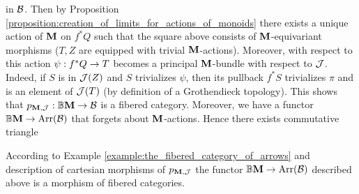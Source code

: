 in ${\mathcal B}$. Then by Proposition \ref{proposition:creation_of_limits_for_actions_of_monoids} there exists a unique action of $\mathbf{M}$ on $f^*Q$ such that the square above consists of $\mathbf{M}$-equivariant morphisms ($T,Z$ are equipped with trivial $\mathbf{M}$-actions). Moreover, with respect to this action $\psi:f^*Q\rightarrow T$ becomes a principal $\mathbf{M}$-bundle with respect to ${\mathcal J}$. Indeed, if $S$ is in ${\mathcal J}(Z)$ and $S$ trivializes $\psi$, then its pullback $f^*S$ trivializes $\pi$ and is an element of ${\mathcal J}(T)$ (by definition of a Grothendieck topology). This shows that $p_{\mathbf{M},{\mathcal J}}:\mathbb{B}\mathbf{M}\rightarrow {\mathcal B}$ is a fibered category. Moreover, we have a functor $\mathbb{B}\mathbf{M}\rightarrow \mathrm{Arr}({\mathcal B})$ that forgets about $\mathbf{M}$-actions. Hence there exists commutative triangle
\begin{center}
\end{center}
According to Example \ref{example:the_fibered_category_of_arrows} and description of cartesian morphisms of $p_{\mathbf{M},{\mathcal J}}$ the functor $\mathbb{B}\mathbf{M}\rightarrow \mathrm{Arr}({\mathcal B})$ described above is a morphism of fibered categories.


